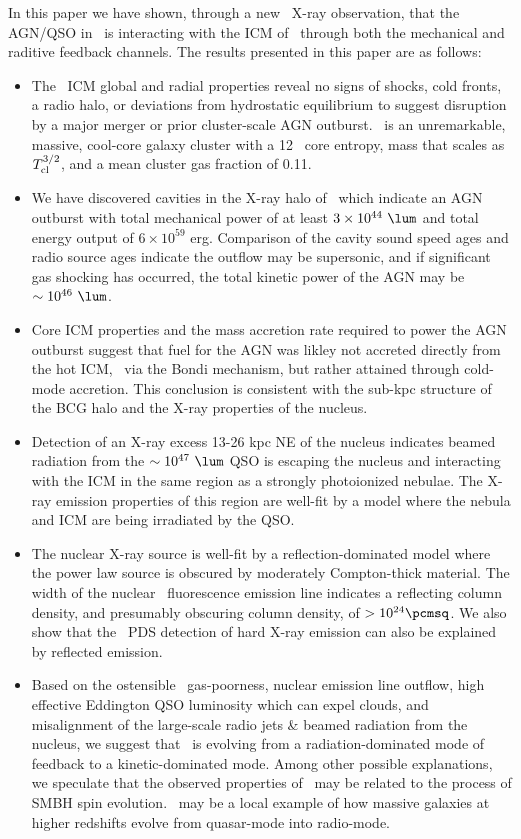 \documentclass[useAMS,usenatbib]{mn2e}
\begin{document}
In this paper we have shown, through a new \chandra\ X-ray
observation, that the AGN/QSO in \iras\ is interacting with the ICM of
\rxj\ through both the mechanical and raditive feedback channels. The
results presented in this paper are as follows:
\begin{itemize}
\item The \rxj\ ICM global and radial properties reveal no signs of
  shocks, cold fronts, a radio halo, or deviations from hydrostatic
  equilibrium to suggest disruption by a major merger or prior
  cluster-scale AGN outburst. \rxj\ is an unremarkable, massive,
  cool-core galaxy cluster with a 12 \ent\ core entropy, mass that
  scales as $T_{\mathrm{cl}}^{3/2}$, and a mean cluster gas fraction of 0.11.
\item We have discovered cavities in the X-ray halo of \irs\ which
  indicate an AGN outburst with total mechanical power of at least $3
  \times 10^{44} ~\lum$ and total energy output of $6 \times 10^{59}$
  erg. Comparison of the cavity sound speed ages and radio source ages
  indicate the outflow may be supersonic, and if significant gas
  shocking has occurred, the total kinetic power of the AGN may be
  $\sim 10^{46} ~\lum$.
\item Core ICM properties and the mass accretion rate required to
  power the AGN outburst suggest that fuel for the AGN was likley not
  accreted directly from the hot ICM, \ie\ via the Bondi mechanism,
  but rather attained through cold-mode accretion. This conclusion is
  consistent with the sub-kpc structure of the BCG halo and the X-ray
  properties of the nucleus.
\item Detection of an X-ray excess 13-26 kpc NE of the nucleus
  indicates beamed radiation from the $\sim 10^{47} ~\lum$ QSO is
  escaping the nucleus and interacting with the ICM in the same region
  as a strongly photoionized nebulae. The X-ray emission properties of
  this region are well-fit by a model where the nebula and ICM are
  being irradiated by the QSO.
\item The nuclear X-ray source is well-fit by a reflection-dominated
  model where the power law source is obscured by moderately
  Compton-thick material. The width of the nuclear \feka\ fluorescence
  emission line indicates a reflecting column density, and presumably
  obscuring column density, of $> 10^{24} \pcmsq$. We also show that
  the \bepposax\ PDS detection of hard X-ray emission can also be
  explained by reflected emission.
\item Based on the ostensible \irs\ gas-poorness, nuclear emission
  line outflow, high effective Eddington QSO luminosity which can
  expel clouds, and misalignment of the large-scale radio jets \&
  beamed radiation from the nucleus, we suggest that \irs\ is evolving
  from a radiation-dominated mode of feedback to a kinetic-dominated
  mode. Among other possible explanations, we speculate that the
  observed properties of \irs\ may be related to the process of SMBH
  spin evolution. \irs\ may be a local example of how massive galaxies
  at higher redshifts evolve from quasar-mode into radio-mode.
\end{itemize}
\end{document}
